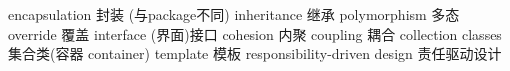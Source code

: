 encapsulation       封装 (与package不同)
inheritance         继承
polymorphism        多态
override            覆盖
interface           (界面)接口
cohesion            内聚
coupling            耦合
collection classes 集合类(容器 container)
template            模板
responsibility-driven design      责任驱动设计
